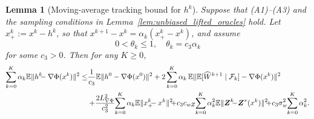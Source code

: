 \documentclass{pkumelon}
\theoremstyle{plain}
\newtheorem{lemma}{Lemma}
\newcommand{\E}{\mathbb{E}}
\newcommand{\Phiobj}{\Phi}
\begin{document}
\begin{lemma}[Moving-average tracking bound for $h^k$]\label{lem:h_tracking_rso}
Suppose that \emph{(A1)}--\emph{(A3)} and the sampling conditions in Lemma~\ref{lem:unbiased_lifted_oracles} hold. Let $x_+^k:=x^k-h^k$, so that $x^{k+1}-x^k=\alpha_k(x_+^k-x^k)$, and assume
\begin{equation*}
0<\theta_k\le 1, \quad \theta_k=c_3\alpha_k
\end{equation*}
for some $c_3>0$. Then for any $K\ge 0$,
{\small
\begin{equation*}
\begin{aligned}
\sum_{k=0}^{K}\alpha_k\E\|h^k\hspace{-0.5em}-\nabla\Phiobj(x^k)\|^2
\le &\frac{1}{c_3}\E\|h^0-\nabla\Phiobj(x^0)\|^2
+2\sum_{k=0}^{K}\alpha_k\,\E\|\E[\widehat W^{k+1}\mid\mathcal F_k]-\nabla\Phiobj(x^k)\|^2\\
&+\hspace{-0.2em}\frac{2L_{\nabla\Phi}^2}{c_3^2}\hspace{-0.2em}\sum_{k=0}^{K}\alpha_k\E\|x_+^k\hspace{-0.5em}-x^k\|^2\hspace{-0.5em}
+\hspace{-0.2em}c_3c_{wZ}\hspace{-0.2em}\sum_{k=0}^{K}\alpha_k^2\E\|\boldsymbol Z^k\hspace{-0.5em}-\hspace{-0.2em}\boldsymbol Z^*(x^k)\|^2\hspace{-0.5em}+\hspace{-0.2em}c_3\sigma_w^2\hspace{-0.2em}\sum_{k=0}^{K}\alpha_k^2.
\end{aligned}
\end{equation*}
}
\end{lemma}
\end{document}

